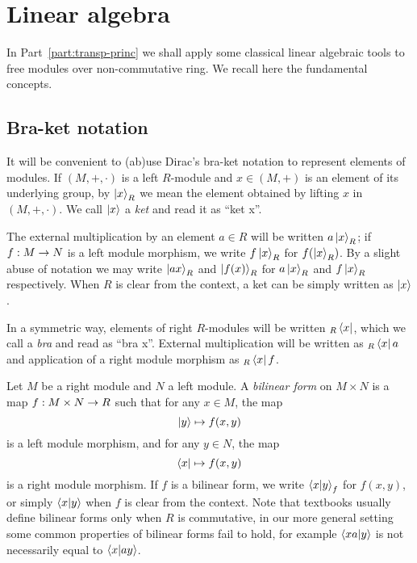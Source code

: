 \section{Linear algebra}
\label{sec:linear-algebra}
In Part~\ref{part:transp-princ} we shall apply some classical linear
algebraic tools to free modules over non-commutative ring. We recall
here the fundamental concepts.


\subsection{Bra-ket notation}
\label{sec:linear-algebra:bra-ket}

It will be convenient to (ab)use Dirac's
bra-ket notation to represent elements of
modules. If $(M,+,\cdot)$ is a left $R$-module and $x\in (M,+)$ is an
element of its underlying group, by $\left\lvert x \right\rangle_R$ we mean the element
obtained by lifting $x$ in $(M,+,\cdot)$. We call
$\left\lvert x \right\rangle$ a
\textit{ket} and read it as ``ket x''.

The external multiplication by an element $a\in R$ will be written
$a\left\lvert x \right\rangle_R$; if $f:M\rightarrow N$ is a left module morphism, we write
$f\left\lvert x \right\rangle_R$ for $f(\left\lvert x \right\rangle_R)$. By a slight abuse of notation we may
write $\left\lvert a x \right\rangle_R$ and $\left\lvert f(x) \right\rangle_R$ for $a\left\lvert x \right\rangle_R$ and
$f\left\lvert x \right\rangle_R$ respectively. When $R$ is clear from the context, a ket
can be simply written as $\left\lvert x \right\rangle$.

In a symmetric way, elements of right $R$-modules will be written
${}_R\left\langle x \right\rvert$, which we call a \textit{bra} and read as
``bra x''. External multiplication will be written as ${}_R\left\langle x \right\rvert a$
and application of a right module morphism as ${}_R\left\langle x \right\rvert f$.

Let $M$ be a right module and $N$ a left module. A
\textit{bilinear
  form} on
$M\times N$ is a map $f:M\times N\rightarrow R$ such that for any $x\in M$,
the map
\[\left\lvert y \right\rangle\mapsto f(x, y)\]
is a left module morphism, and for any $y\in N$, the map
\[\left\langle x \right\rvert\mapsto f(x, y)\]
is a right module morphism. If $f$ is a bilinear form, we write
$\left\langle x \middle| y \right\rangle_f$ for $f(x,y)$, or simply $\left\langle x \middle| y \right\rangle$ when $f$ is
clear from the context. Note that textbooks usually define bilinear
forms only when $R$ is commutative, in our more general setting some
common properties of bilinear forms fail to hold, for example
$\left\langle xa \middle| y \right\rangle$ is not necessarily equal to $\left\langle x \middle| ay \right\rangle$.

